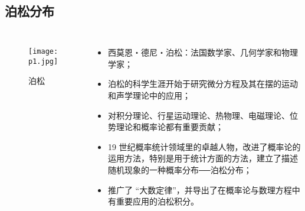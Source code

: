 \subsection{泊松分布}
\begin{frame}
	\begin{columns}
		\column{4cm}
		\begin{figure}[htbp]\nonumber
			\centering
			\texttt{[image: p1.jpg]}
			\caption{泊松}
		\end{figure}
		\pause
		\column{6cm}
		\begin{itemize}[<+-|alert@+>]
			\item 西莫恩・德尼・泊松：法国数学家、几何学家和物理学家；
			\item 泊松的科学生涯开始于研究微分方程及其在摆的运动和声学理论中的应用；
			\item 对积分理论、行星运动理论、热物理、电磁理论、位势理论和概率论都有重要贡献；
			\item 19 世纪概率统计领域里的卓越人物，改进了概率论的运用方法，特别是用于统计方面的方法，建立了描述随机现象的一种概率分布──泊松分布；
			\item 推广了 “大数定律”，并导出了在概率论与数理方程中有重要应用的泊松积分。
		\end{itemize}


	\end{columns}
\end{frame}


